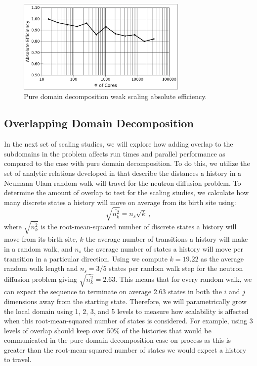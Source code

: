\documentclass{snamc2013}
\begin{document}
\begin{figure}[H]
  \begin{center}
    \includegraphics[width=3.25in]{titan_weak_absolute.pdf}
  \end{center}
  \caption{Pure domain decomposition weak scaling absolute
    efficiency.}
  \label{fig:titan_weak_absolute}
\end{figure}

\subsection{Overlapping Domain Decomposition}
\label{subsec:overlapping_domain_decomp}
In the next set of scaling studies, we will explore how adding overlap
to the subdomains in the problem affects run times and parallel
performance as compared to the case with pure domain decomposition. To
do this, we utilize the set of analytic relations developed in
\cite{slattery_spectral_2013} that describe the distances a history in
a Neumann-Ulam random walk will travel for the neutron diffusion
problem. To determine the amount of overlap to test for the scaling
studies, we calculate how many discrete states a history will move on
average from its birth site using:
\begin{equation}
  \sqrt{\bar{n^2_k}} = n_s \sqrt{k}\:,
  \label{eq:discrete_distance}
\end{equation}
where $\sqrt{\bar{n^2_k}}$ is the root-mean-squared number of discrete
states a history will move from its birth site, $k$ the average number
of transitions a history will make in a random walk, and $n_s$ the
average number of states a history will move per transition in a
particular direction. Using \cite{slattery_spectral_2013} we compute
$k=19.22$ as the average random walk length and $n_s = 3/5$ states per
random walk step for the neutron diffusion problem giving
$\sqrt{\bar{n^2_k}} = 2.63$. This means that for every random walk, we
can expect the sequence to terminate on average 2.63 states in both
the $i$ and $j$ dimensions away from the starting state. Therefore, we
will parametrically grow the local domain using 1, 2, 3, and 5 levels
to measure how scalability is affected when this root-mean-squared
number of states is considered. For example, using 3 levels of overlap
should keep over 50\% of the histories that would be communicated in
the pure domain decomposition case on-process as this is greater than
the root-mean-squared number of states we would expect a history to
travel.
\end{document}
